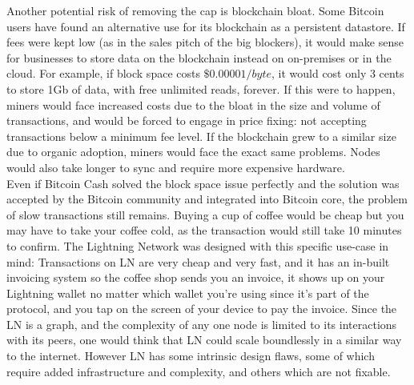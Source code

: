 \documentclass{report}
\begin{document}
		Another potential risk of removing the cap is blockchain bloat. Some Bitcoin users have found an alternative use for its blockchain as a persistent datastore. If fees were kept low (as in the sales pitch of the big blockers), it would make sense for businesses to store data on the blockchain instead on on-premises or in the cloud.  For example, if block space costs $\$0.00001/byte$, it would cost only 3 cents to store 1Gb of data, with free unlimited reads, forever. If this were to happen, miners would face increased costs due to the bloat in the size and volume of transactions, and would be forced to engage in price fixing:  not accepting transactions below a minimum fee level. If the blockchain grew to a similar size due to organic adoption, miners would face the exact same problems. Nodes would also take longer to sync and require more expensive hardware. \\
		
		Even if Bitcoin Cash solved the block space issue perfectly and the solution was accepted by the Bitcoin community and integrated into Bitcoin core, the problem of slow transactions still remains. Buying a cup of coffee would be cheap but you may have to take your coffee cold, as the transaction would still take 10 minutes to confirm. The Lightning Network was designed with this specific use-case in mind: Transactions on LN are very cheap and very fast, and it has an in-built invoicing system so the coffee shop sends you an invoice, it shows up on your Lightning wallet no matter which wallet you're using since it's part of the protocol, and you tap on the screen of your device to pay the invoice. Since the LN is a graph, and the complexity of any one node is limited to its interactions with its peers, one would think that LN could scale boundlessly in a similar way to the internet. However LN has some intrinsic design flaws, some of which require added infrastructure and complexity, and others which are not fixable.
\end{document}
